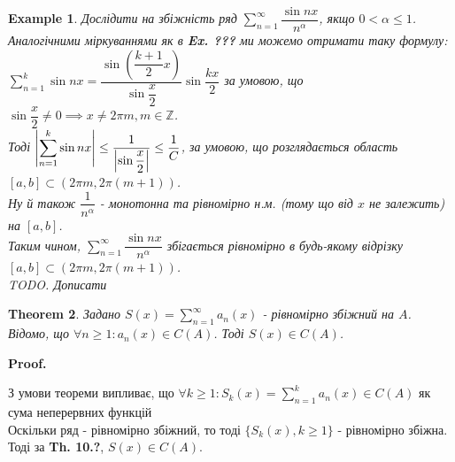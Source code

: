 \documentclass[a4paper, 10pt]{article}
\makeatletter
\def\huge{\displaystyle}
\def\qed{$\blacksquare$}
\theoremstyle{theoremdd}
\newtheorem{theorem}{Theorem}[subsection]
\theoremstyle{theoremdd}
\theoremstyle{theoremdd}
\theoremstyle{theoremdd}
\newtheorem{example}[theorem]{Example}
\theoremstyle{theoremdd}
\theoremstyle{theoremdd}
\theoremstyle{theoremdd}
\theoremstyle{theoremdd}
\renewenvironment{proof}[1][Proof.\\]{\par
\pushQED{\hfill \qed}%
\normalfont \topsep6\p@\@plus6\p@\relax
\trivlist
\item\relax
{\bfseries
#1\@addpunct{.}}\hspace\labelsep\ignorespaces
}{%
\popQED\endtrivlist\@endpefalse
}
\makeatother
\begin{document}
\begin{example}
Дослідити на збіжність ряд $\huge\sum_{n=1}^\infty \dfrac{\sin nx}{n^\alpha}$, якщо $0 < \alpha \leq 1$.\\
Аналогічними міркуваннями як в \textbf{Ex. ???} ми можемо отримати таку формулу:\\
$\huge\sum_{n=1}^k \sin nx = \dfrac{\sin \left(\dfrac{k+1}{2}x \right)}{\sin \dfrac{x}{2}} \sin \dfrac{kx}{2}$ за умовою, що $\sin \dfrac{x}{2} \neq 0 \implies x \neq 2 \pi m, m \in \mathbb{Z}$.\\
Тоді $\abs{\huge\sum_{n=1}^k \sin n x} \leq \dfrac{1}{\abs{\sin \dfrac{x}{2}}} \leq \dfrac{1}{C}$, за умовою, що розглядається область $[a,b] \subset (2\pi m, 2 \pi (m+1))$.\\
Ну й також $\dfrac{1}{n^\alpha}$ - монотонна та рівномірно н.м. (тому що від $x$ не залежить) на $[a,b]$.\\
Таким чином, $\huge\sum_{n=1}^\infty \dfrac{\sin nx}{n^\alpha}$ збігається рівномірно в будь-якому відрізку $[a,b] \subset (2\pi m, 2 \pi (m+1))$.\\
\textit{TODO. Дописати}
\end{example}

\begin{theorem}
Задано $S(x) = \huge \sum_{n=1}^\infty a_n(x)$ - рівномірно збіжний на $A$.\\
Відомо, що $\forall n \geq 1: a_n(x) \in C(A)$. Тоді $S(x) \in C(A)$.
\end{theorem}

\begin{proof}
З умови теореми випливає, що $\forall k \geq 1: S_k(x) = \huge \sum_{n=1}^k a_n(x) \in C(A)$ як сума неперервних функцій\\
Оскільки ряд - рівномірно збіжний, то тоді $\{S_k(x), k \geq 1\}$ - рівномірно збіжна. Тоді за \textbf{Th. 10.?}, $S(x) \in C(A)$.
\end{proof}
\end{document}
